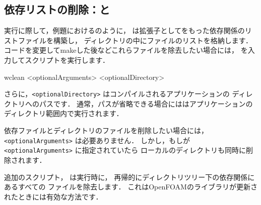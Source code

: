 \subsection{依存リストの削除：と}
\label{ssec:3.2.3}
実行に際して，例題におけるのように，
は拡張子としてをもった依存関係のリストファイルを構築し，
ディレクトリの中にファイルのリストを格納します．
コードを変更してmakeした後などこれらファイルを除去したい場合には，
%
%
を入力してスクリプトを実行します．
\begin{OFverbatim}[terminal]
wclean <optionalArguments> <optionalDirectory>
\end{OFverbatim}
さらに，\texttt{<optionalDirectory>} はコンパイルされるアプリケーションの
ディレクトリへのパスです．
通常，パスが省略できる場合にははアプリケーションの
ディレクトリ範囲内で実行されます．

依存ファイルとディレクトリのファイルを削除したい場合には，
\texttt{<optionalArguments>} は必要ありません．
しかし，もしが \texttt{<optionalArguments>} に指定されていたら
ローカルのディレクトリも同時に削除されます．

追加のスクリプト，
%
%
は実行時に，
再帰的にディレクトリツリー下の依存関係にあるすべての
ファイルを除去します．
これはOpenFOAMのライブラリが更新されたときには有効な方法です．


